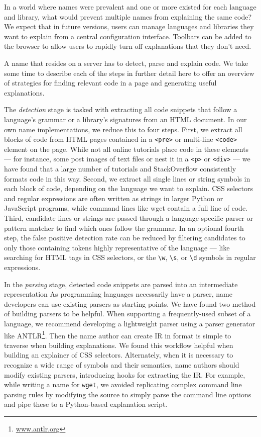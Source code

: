 In a world where \glspl{name} were prevalent and one or more existed for each language and library, what would prevent multiple \glspl{name} from explaining the same code?
We expect that in future versions, users can manage languages and libraries they want to explain from a central configuration interface.
Toolbars can be added to the browser to allow users to rapidly turn off explanations that they don't need.

A \gls{name} that resides on a server has to detect, parse and explain code.
We take some time to describe each of the steps in further detail here to offer an overview of strategies for finding relevant code in a page and generating useful explanations.

The \emph{detection} stage is tasked with extracting all code snippets that follow a language's grammar or a library's signatures from an HTML document.
In our own \gls{name} implementations, we reduce this to four steps.
First, we extract all blocks of code from HTML pages contained in a \texttt{<pre>} or multi-line \texttt{<code>} element on the page.
While not all online tutorials place code in these elements --- for instance, some post images of text files or nest it in a \texttt{<p>} or \texttt{<div>} --- we have found that a large number of tutorials and StackOverflow consistently formats code in this way.
Second, we extract all single lines or string symbols in each block of code, depending on the language we want to explain.
CSS selectors and regular expressions are often written as strings in larger Python or JavaScript programs, while command lines like wget contain a full line of code.
Third, candidate lines or strings are passed through a language-specific parser or pattern matcher to find which ones follow the grammar.
In an optional fourth step, the false positive detection rate can be reduced by filtering candidates to only those containing tokens highly representative of the language --- like searching for HTML tags in CSS selectors, or the \texttt{\textbackslash{}w}, \texttt{\textbackslash{}s}, or \texttt{\textbackslash{}d} symbols in regular expressions.

In the \emph{parsing} stage, detected code snippets are parsed into an intermediate representation
As programming languages necessarily have a parser, \gls{name} developers can use existing parsers as starting points.
We have found two method of building parsers to be helpful.
When supporting a frequently-used subset of a language, we recommend developing a lightweight parser using a parser generator like ANTLR\footnote{\url{www.antlr.org}}.
Then the \gls{name} author can create IR in format is simple to traverse when building explanations.
We found this workflow helpful when building an explainer of CSS selectors.
Alternately, when it is necessary to recognize a wide range of symbols and their semantics, \gls{name} authors should modify existing parsers, introducing hooks for extracting the IR.
For example, while writing a \gls{name} for \texttt{wget}, we avoided replicating complex command line parsing rules by modifying the source to simply parse the command line options and pipe these to a Python-based explanation script.


